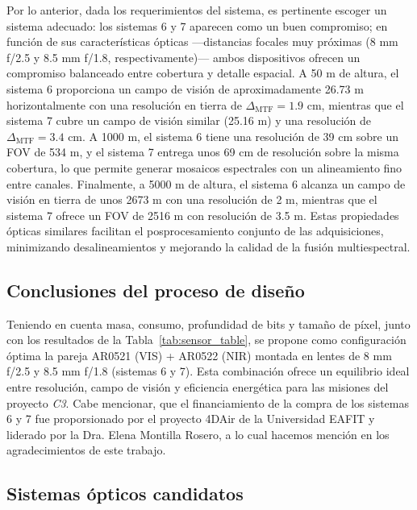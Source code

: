\noindent Por lo anterior, dada los requerimientos del sistema, es pertinente escoger un sistema adecuado: los sistemas 6 y 7 aparecen como un buen compromiso; en función de sus características ópticas —distancias focales muy próximas (8 mm f/2.5 y 8.5 mm f/1.8, respectivamente)— ambos dispositivos ofrecen un compromiso balanceado entre cobertura y detalle espacial. A 50 m de altura, el sistema 6 proporciona un campo de visión de aproximadamente 26.73 m horizontalmente con una resolución en tierra de $\Delta_{\mathrm{MTF}}=1.9$ cm, mientras que el sistema 7 cubre un campo de visión similar (25.16 m) y una resolución de $\Delta_{\mathrm{MTF}}=3.4$ cm. A 1000 m, el sistema 6 tiene una resolución de 39 cm sobre un FOV de 534 m, y el sistema 7 entrega unos 69 cm de resolución sobre la misma cobertura, lo que permite generar mosaicos espectrales con un alineamiento fino entre canales. Finalmente, a 5000 m de altura, el sistema 6 alcanza un campo de visión en tierra de unos 2673 m con una resolución de 2 m, mientras que el sistema 7 ofrece un FOV de 2516 m con resolución de 3.5 m. Estas propiedades ópticas similares facilitan el posprocesamiento conjunto de las adquisiciones, minimizando desalineamientos y mejorando la calidad de la fusión multiespectral.  


\subsection{Conclusiones del proceso de diseño}

\noindent Teniendo en cuenta masa, consumo, profundidad de bits y tamaño de píxel, junto con los resultados de la Tabla~\ref{tab:sensor_table}, se propone como configuración óptima la pareja AR0521 (VIS) + AR0522 (NIR) montada en lentes de 8 mm f/2.5 y 8.5 mm f/1.8 (sistemas 6 y 7). Esta combinación ofrece un equilibrio ideal entre resolución, campo de visión y eficiencia energética para las misiones del proyecto \textit{C3}. Cabe mencionar, que el financiamiento de la compra de los sistemas 6 y 7 fue proporsionado por el proyecto 4DAir de la Universidad EAFIT y liderado por la Dra. Elena Montilla Rosero, a lo cual hacemos mención en los agradecimientos de este trabajo.\\

\subsection{Sistemas ópticos candidatos}%
\label{ap:sistemas_candidatos} 


